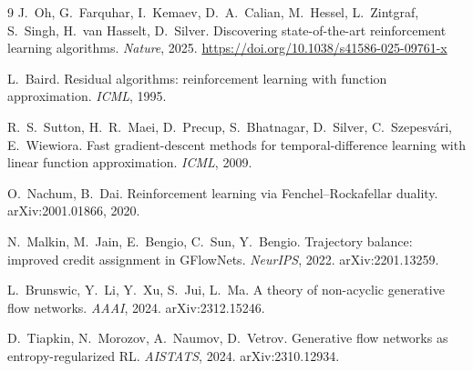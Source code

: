 \documentclass[11pt]{article}
\theoremstyle{remark}
\begin{document}
\begin{thebibliography}{9}
 J.~Oh, G.~Farquhar, I.~Kemaev, D.~A.~Calian, M.~Hessel,
L.~Zintgraf, S.~Singh, H.~van Hasselt, D.~Silver.
\newblock Discovering state-of-the-art reinforcement learning algorithms.
\newblock \emph{Nature}, 2025. \url{https://doi.org/10.1038/s41586-025-09761-x}

 L.~Baird.
\newblock Residual algorithms: reinforcement learning with function
approximation.
\newblock \emph{ICML}, 1995.

 R.~S.~Sutton, H.~R.~Maei, D.~Precup, S.~Bhatnagar,
D.~Silver, C.~Szepesv\'ari, E.~Wiewiora.
\newblock Fast gradient-descent methods for temporal-difference learning with
linear function approximation.
\newblock \emph{ICML}, 2009.

 O.~Nachum, B.~Dai.
\newblock Reinforcement learning via Fenchel--Rockafellar duality.
\newblock arXiv:2001.01866, 2020.

 N.~Malkin, M.~Jain, E.~Bengio, C.~Sun, Y.~Bengio.
\newblock Trajectory balance: improved credit assignment in GFlowNets.
\newblock \emph{NeurIPS}, 2022. arXiv:2201.13259.

 L.~Brunswic, Y.~Li, Y.~Xu, S.~Jui, L.~Ma.
\newblock A theory of non-acyclic generative flow networks.
\newblock \emph{AAAI}, 2024. arXiv:2312.15246.

 D.~Tiapkin, N.~Morozov, A.~Naumov, D.~Vetrov.
\newblock Generative flow networks as entropy-regularized RL.
\newblock \emph{AISTATS}, 2024. arXiv:2310.12934.
\end{thebibliography}
\end{document}
